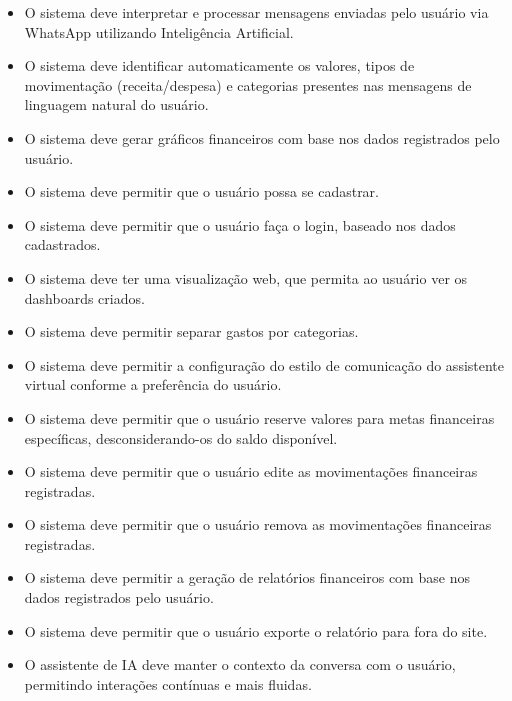 \begin{itemize}
    \item O sistema deve interpretar e processar mensagens enviadas pelo usuário via WhatsApp utilizando Inteligência Artificial.

    \item O sistema deve identificar automaticamente os valores, tipos de movimentação (receita/despesa) e categorias presentes nas mensagens de linguagem natural do usuário.

    \item O sistema deve gerar gráficos financeiros com base nos dados registrados pelo usuário.

    \item O sistema deve permitir que o usuário possa se cadastrar.

    \item O sistema deve permitir que o usuário faça o login, baseado nos dados cadastrados.

    \item O sistema deve ter uma visualização web, que permita ao usuário ver os dashboards criados.

    \item O sistema deve permitir separar gastos por categorias.

    \item O sistema deve permitir a configuração do estilo de comunicação do assistente virtual conforme a preferência do usuário.

    \item O sistema deve permitir que o usuário reserve valores para metas financeiras específicas, desconsiderando-os do saldo disponível.

    \item O sistema deve permitir que o usuário edite as movimentações financeiras registradas.

    \item O sistema deve permitir que o usuário remova as movimentações financeiras registradas.

    \item O sistema deve permitir a geração de relatórios financeiros com base nos dados registrados pelo usuário.

    \item O sistema deve permitir que o usuário exporte o relatório para fora do site.

    \item O assistente de IA deve manter o contexto da conversa com o usuário, permitindo interações contínuas e mais fluidas.

\end{itemize}


